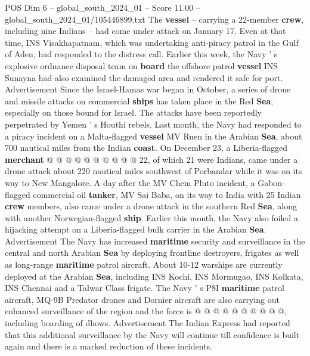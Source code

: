 \begin{textsample}{POS Dim 6 – global\_south\_2024\_01 – Score 11.00 – global\_south\_2024\_01/105446899.txt}
The \textbf{vessel} -- carrying a 22-member \textbf{crew}, including nine Indians -- had come under attack on January 17.
Even at that time, INS Visakhapatnam, which was undertaking anti-piracy patrol in the Gulf of Aden, had responded to the distress call.
Earlier this week, the Navy ' s explosive ordnance disposal team on \textbf{board} the offshore patrol \textbf{vessel} INS Sunayna had also examined the damaged area and rendered it safe for port.
Advertisement Since the Israel-Hamas war began in October, a series of drone and missile attacks on commercial \textbf{ships} has taken place in the Red \textbf{Sea}, especially on those bound for Israel.
The attacks have been reportedly perpetrated by Yemen ' s Houthi rebels.
Last month, the Navy had responded to a piracy incident on a Malta-flagged \textbf{vessel} MV Ruen in the Arabian \textbf{Sea}, about 700 nautical miles from the Indian \textbf{coast}.
On December 23, a Liberia-flagged \textbf{merchant} @ @ @ @ @ @ @ @ @ @ 22, of which 21 were Indians, came under a drone attack about 220 nautical miles southwest of Porbandar while it was on its way to New Mangalore.
A day after the MV Chem Pluto incident, a Gabon-flagged commercial oil \textbf{tanker}, MV Sai Baba, on its way to India with 25 Indian \textbf{crew} members, also came under a drone attack in the southern Red \textbf{Sea}, along with another Norwegian-flagged \textbf{ship}.
Earlier this month, the Navy also foiled a hijacking attempt on a Liberia-flagged bulk carrier in the Arabian \textbf{Sea}.
Advertisement The Navy has increased \textbf{maritime} security and surveillance in the central and north Arabian \textbf{Sea} by deploying frontline destroyers, frigates as well as long-range \textbf{maritime} patrol aircraft.
About 10-12 warships are currently deployed at the Arabian \textbf{Sea}, including INS Kochi, INS Mormugao, INS Kolkata, INS Chennai and a Talwar Class frigate.
The Navy ' s P8I \textbf{maritime} patrol aircraft, MQ-9B Predator drones and Dornier aircraft are also carrying out enhanced surveillance of the region and the force is @ @ @ @ @ @ @ @ @ @, including boarding of dhows.
Advertisement The Indian Express had reported that this additional surveillance by the Navy will continue till confidence is built again and there is a marked reduction of these incidents.

\end{textsample}
